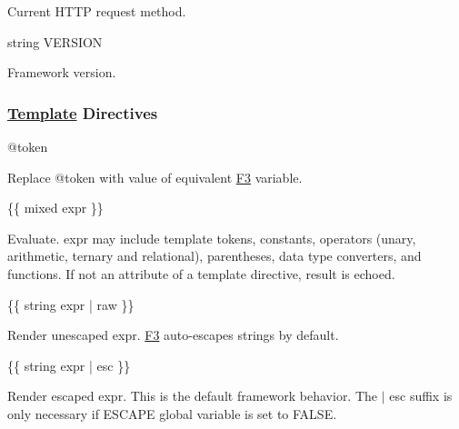 \begin{DoxyItemize}
\item Current H\+T\+TP request method.
\end{DoxyItemize}

{\ttfamily string V\+E\+R\+S\+I\+ON}


\begin{DoxyItemize}
\item Framework version.
\end{DoxyItemize}

\subsubsection*{\hyperlink{class_template}{Template} Directives}


\begin{DoxyCode}
@token
\end{DoxyCode}

\begin{DoxyItemize}
\item Replace {\ttfamily @token} with value of equivalent \hyperlink{class_f3}{F3} variable.
\end{DoxyItemize}


\begin{DoxyCode}
\{\{ mixed expr \}\}
\end{DoxyCode}

\begin{DoxyItemize}
\item Evaluate. {\ttfamily expr} may include template tokens, constants, operators (unary, arithmetic, ternary and relational), parentheses, data type converters, and functions. If not an attribute of a template directive, result is echoed.
\end{DoxyItemize}


\begin{DoxyCode}
\{\{ string expr | raw \}\}
\end{DoxyCode}

\begin{DoxyItemize}
\item Render unescaped {\ttfamily expr}. \hyperlink{class_f3}{F3} auto-\/escapes strings by default.
\end{DoxyItemize}


\begin{DoxyCode}
\{\{ string expr | esc \}\}
\end{DoxyCode}

\begin{DoxyItemize}
\item Render escaped {\ttfamily expr}. This is the default framework behavior. The {\ttfamily $\vert$ esc} suffix is only necessary if {\ttfamily E\+S\+C\+A\+PE} global variable is set to {\ttfamily F\+A\+L\+SE}.
\end{DoxyItemize}


